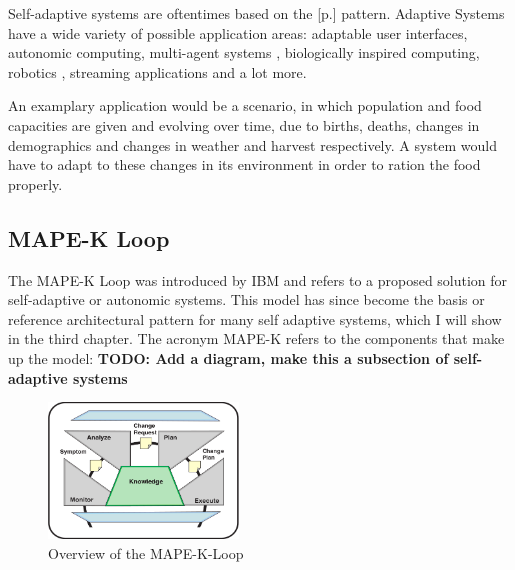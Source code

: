     Self-adaptive systems are oftentimes based on the  [p.\pageref{sub:mape}] pattern.
    Adaptive Systems have a wide variety of possible application areas: adaptable user interfaces, autonomic computing, multi-agent systems \cite{Cheng:2009:SES:1573856.1573858}, 
    biologically inspired computing, robotics \cite{10.1007/978-3-319-59480-4_44}, streaming applications and a lot more.

    An examplary application would be a scenario, in which population and food capacities are given and evolving over time, due to births, deaths, changes in demographics 
    and changes in weather and harvest respectively. A system would have to adapt to these changes in its environment in order to ration the food properly.

    
    \subsection{MAPE-K Loop}
    \label{sub:mape}
    The MAPE-K Loop was introduced by IBM \cite{Kephart:2003:VAC:642194.642200} and refers to a proposed solution for self-adaptive or autonomic systems.
    This model has since become the basis or reference architectural pattern for many self adaptive systems, which I will show in the third chapter.
    The acronym MAPE-K refers to the components that make up the model:
    \textbf{TODO: Add a diagram, make this a subsection of self-adaptive systems}
     \begin{figure}[hbt]
        \label{fig:mape}
        \centering
        \includegraphics[width=0.45\textwidth]{Bilder/mape.png}
        \caption{
                Overview of the MAPE-K-Loop\cite{Kephart:2003:VAC:642194.642200}
                }
    \end{figure}  
